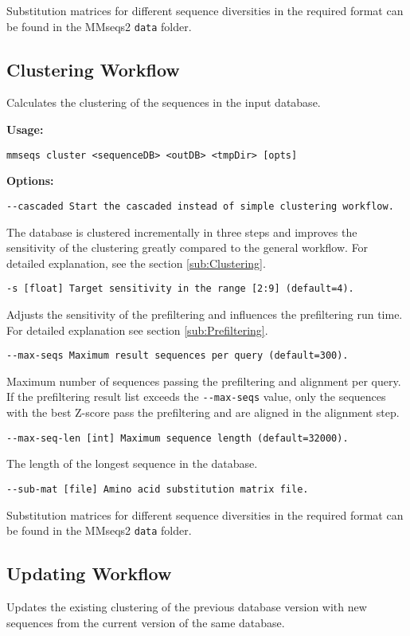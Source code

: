 \documentclass[11pt,a4paper]{scrreprt}
\begin{document}
Substitution matrices for different sequence diversities in the required format can be found in the MMseqs2 \texttt{data} folder.
\subsection{Clustering Workflow} \label{sub:Clustering-workflow}
Calculates the clustering of the sequences in the input database. 


\textbf{Usage:}


\texttt{mmseqs cluster  <sequenceDB> <outDB> <tmpDir> {[}opts{]}}


\textbf{Options:}


\texttt{\small -{}-cascaded Start the cascaded instead of simple clustering workflow.}{\small \par}


The database is clustered incrementally in three steps and improves the sensitivity of the clustering greatly compared to the general workflow. For detailed explanation, see the section \ref{sub:Clustering}.


\texttt{\small -s {[}float{]} Target sensitivity in the range {[}2:9{]} (default=4).}{\small \par}


Adjusts the sensitivity of the prefiltering and influences the prefiltering run time. For detailed explanation see section \ref{sub:Prefiltering}.


\texttt{\small -{}-max-seqs Maximum result sequences per query (default=300).}{\small \par}


Maximum number of sequences passing the prefiltering and alignment per query. If the prefiltering result list exceeds the \texttt{-{}-max-seqs} value, only the sequences with the best Z-score pass the prefiltering and are aligned in the alignment step.


\texttt{\small -{}-max-seq-len {[}int{]} Maximum sequence length (default=32000).}{\small \par}


The length of the longest sequence in the database.


\texttt{\small -{}-sub-mat {[}file{]} Amino acid substitution matrix file.}{\small \par}


Substitution matrices for different sequence diversities in the required format can be found in the MMseqs2 \texttt{data} folder.
\subsection{Updating Workflow}
Updates the existing clustering of the previous database version with new sequences from the current version of the same database.
\end{document}

